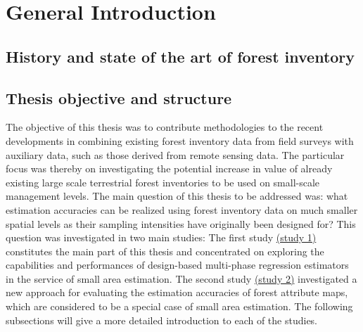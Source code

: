 	
			
	

	
\chapter{General Introduction}
\label{chap:intro}
\newpage

\section{History and state of the art of forest inventory}
\label{sec:intro:hist_soa}



\newpage
\section{Thesis objective and structure}
\label{sec:intro:obj_and_struct}

The objective of this thesis was to contribute methodologies to the recent developments in combining existing forest inventory data from field surveys with auxiliary data, such as those derived from remote sensing data. The particular focus was thereby on investigating the potential increase in value of already existing large scale terrestrial forest inventories to be used on small-scale management levels. The main question of this thesis to be addressed was: what estimation accuracies can be realized using forest inventory data on much smaller spatial levels as their sampling intensities have originally been designed for? This question was investigated in two main studies: The first study \hyperref[sec:study1]{(study 1)} constitutes the main part of this thesis and concentrated on exploring the capabilities and performances of design-based multi-phase regression estimators in the service of small area estimation. The second study \hyperref[sec:study2]{(study 2)} investigated a new approach for evaluating the estimation accuracies of forest attribute maps, which are considered to be a special case of small area estimation. The following subsections will give a more detailed introduction to each of the studies.


